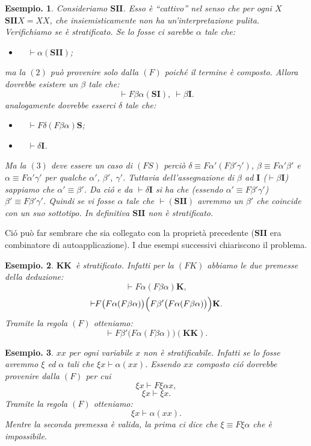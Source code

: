 \documentclass{book}
\newtheorem{esempio}{Esempio.}
\newcommand*{\II}{$\mathbf{I}$}    %
\newcommand*{\KK}{$\mathbf{K}$}    %
\newcommand*{\SSS}{$\mathbf{S}$}   %
\newcommand*{\ii}{\mathbf{I}}    %
\newcommand*{\kk}{\mathbf{K}}    %
\newcommand*{\sss}{\mathbf{S}}   %
\newcommand*{\asse}{\vdash\!\!           }
\begin{document}
\begin{esempio}
Consideriamo \SSS\II\II.
Esso \`e ``cattivo'' nel senso che per ogni $X$ $\sss\ii\ii X = XX$, che 
insiemisticamente non ha un'interpretazione pulita. Verifichiamo se \`e 
stratificato. Se lo fosse ci sarebbe $\alpha$ tale che:
\begin{itemize}
\item[$(2)$]$\quad \asse\alpha(\sss\ii\ii)$;
\end{itemize}
ma la $(2)$ pu\`o provenire solo dalla $(F)$ poich\'e il termine \`e composto.
Allora dovrebbe esistere un $\beta$ tale che:
\[
\asse F\beta\alpha(\sss\ii), \ \asse\beta\ii.
\]
analogamente dovrebbe esserci $\delta$ tale che:
\begin{itemize}
\item[$(3)$]$\quad \asse F\delta(F\beta\alpha)\sss$;
\item[]$\quad \asse \delta\ii$.
\end{itemize}
Ma la $(3)$ deve essere un caso di $(FS)$ perci\`o $\delta \equiv F\alpha'(F
\beta'\gamma')$, $\beta \equiv F\alpha'\beta'$ e $\alpha \equiv F\alpha'\gamma'
$ per qualche $\alpha'$, $\beta'$, $\gamma'$. Tuttavia dell'assegnazione di
$\beta$ ad $\ii$ ($\asse\beta\ii$) sappiamo che $\alpha' \equiv \beta'$.
Da ci\'o e da $\asse \delta\ii$ si ha che (essendo $\alpha' \equiv F\beta'
\gamma'$) $\beta' \equiv F\beta'\gamma'$. Quindi se vi fosse $\alpha$ tale che
$\asse(\sss\ii\ii)$ avremmo un $\beta'$ che coincide con un suo sottotipo. In
definitiva $\sss\ii\ii$ non \`e stratificato.
\end{esempio}

Ci\'o pu\`o far sembrare che sia collegato con la propriet\`a precedente
($\sss\ii\ii$ era combinatore di autoapplicazione). I due esempi successivi
chiariscono il problema.
\begin{esempio}
\KK\KK~\`e stratificato. Infatti per la $(FK)$ abbiamo le due premesse della 
deduzione:
\[
\asse F\alpha(F\beta\alpha)\kk,
\]
\[
\asse F\bigl(F\alpha(F\beta\alpha)\bigr)\Bigl(F\beta'\bigl(F\alpha(F\beta\alpha
)\bigr)\Bigr)\kk.
\]
Tramite la regola $(F)$ otteniamo:
\[
\asse F\beta'\bigl(F\alpha(F\beta\alpha)\bigr)(\kk\kk).
\]
\end{esempio}

\begin{esempio}
$xx$ per ogni variabile $x$ non \`e stratificabile. Infatti se lo fosse 
avremmo $\xi$ ed $\alpha$ tali che $\xi x \asse \alpha(xx)$. Essendo $xx$
composto ci\'o dovrebbe provenire dalla $(F)$ per cui
\[
\xi x \asse F\xi\alpha x,
\]
\[
\xi x \asse \xi x.
\]
Tramite la regola $(F)$ otteniamo:
\[
\xi x \asse \alpha(xx).
\]
Mentre la seconda premessa \`e valida, la prima ci dice che $\xi \equiv F\xi
\alpha$ che \`e impossibile.
\end{esempio}
\end{document}
